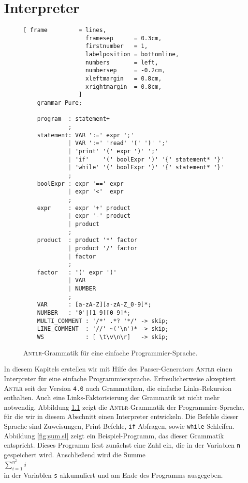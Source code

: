 \chapter{Interpreter \label{chapter:interpreter}}


\begin{figure}[!ht]
\centering
\begin{Verbatim}[ frame         = lines, 
                  framesep      = 0.3cm, 
                  firstnumber   = 1,
                  labelposition = bottomline,
                  numbers       = left,
                  numbersep     = -0.2cm,
                  xleftmargin   = 0.8cm,
                  xrightmargin  = 0.8cm,
                ]
    grammar Pure;
    
    program  : statement+
             ;  
    statement: VAR ':=' expr ';'
             | VAR ':=' 'read' '(' ')' ';'
             | 'print' '(' expr ')' ';'
             | 'if'    '(' boolExpr ')' '{' statement* '}'
             | 'while' '(' boolExpr ')' '{' statement* '}'
             ;
    boolExpr : expr '==' expr
             | expr '<'  expr
             ;
    expr     : expr '+' product
             | expr '-' product
             | product
             ;
    product  : product '*' factor
             | product '/' factor
             | factor
             ;
    factor   : '(' expr ')'
             | VAR
             | NUMBER
             ;
    VAR      : [a-zA-Z][a-zA-Z_0-9]*;
    NUMBER   : '0'|[1-9][0-9]*;
    MULTI_COMMENT : '/*' .*? '*/' -> skip;
    LINE_COMMENT  : '//' ~('\n')* -> skip;
    WS            : [ \t\v\n\r]   -> skip; 
\end{Verbatim}
\vspace*{-0.3cm}
\caption{\textsc{Antlr}-Grammatik f\"ur eine einfache Programmier-Sprache.}
\label{fig:Pure.g4}
\end{figure}

In diesem Kapitels erstellen wir mit Hilfe des Parser-Generators \textsc{Antlr} einen
Interpreter f\"ur eine einfache Programmiersprache.  Erfreulicherweise akzeptiert
\textsc{Antlr} seit der Version \texttt{4.0} auch Grammatiken, die einfache Links-Rekursion
enthalten.  Auch eine Links-Faktorisierung der Grammatik ist nicht mehr notwendig.
Abbildung \ref{fig:Pure.g4} zeigt die \textsc{Antlr}-Grammatik der Programmier-Sprache, f\"ur die wir
in diesem Abschnitt einen Interpreter entwickeln.  Die Befehle dieser Sprache sind Zuweisungen, Print-Befehle,
\texttt{if}-Abfragen, sowie \texttt{while}-Schleifen.  Abbildung \ref{fig:sum.sl} zeigt
ein Beispiel-Programm, das dieser Grammatik entspricht.  Dieses Programm liest zun\"achst eine Zahl
ein, die in der Variablen \texttt{n} gespeichert wird.  Anschlie{\ss}end wird die Summe
\\[0.2cm]
\hspace*{1.3cm}
$\sum\limits_{i=1}^{n^2} i$
\\[0.2cm]
in der Variablen \texttt{s} akkumuliert und am Ende des Programms ausgegeben.


